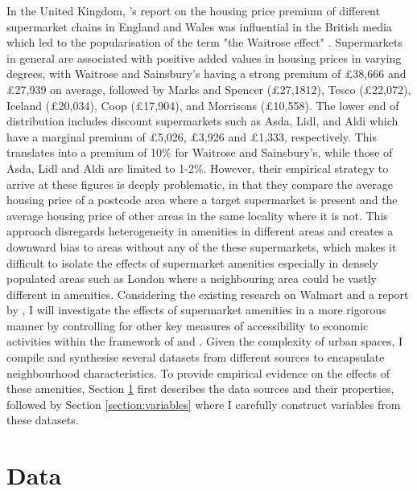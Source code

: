 \documentclass{article}
\begin{document}
In the United Kingdom, \citet{LloydsBank2016LivingHome}'s report on the housing price premium of different supermarket chains in England and Wales was influential in the British media which led to the popularisation of the term "the Waitrose effect" \citep{TheIndependent2017WaitrosePounds}. Supermarkets in general are associated with positive added values in housing prices in varying degrees, with Waitrose and Sainsbury's having a strong premium of £38,666 and £27,939 on average, followed by Marks and Spencer (£27,1812), Tesco (£22,072), Iceland (£20,034), Coop (£17,904), and Morrisons (£10,558). The lower end of distribution includes discount supermarkets such as Asda, Lidl, and Aldi which have a marginal premium of £5,026, £3,926 and £1,333, respectively. This translates into a premium of 10\% for Waitrose and Sainsbury's, while those of Asda, Lidl and Aldi are limited to 1-2\%. However, their empirical strategy to arrive at these figures is deeply problematic, in that they compare the average housing price of a postcode area where a target supermarket is present and the average housing price of other areas in the same locality where it is not. This approach disregards heterogeneity in amenities in different areas and creates a downward bias to areas without any of the these supermarkets, which makes it difficult to isolate the effects of supermarket amenities especially in densely populated areas such as London where a neighbouring area could be vastly different in amenities. Considering the existing research on Walmart and a report by \citet{LloydsBank2016LivingHome}, I will investigate the effects of supermarket amenities in a more rigorous manner by controlling for other key measures of accessibility to economic activities within the framework of \citet{AlonsoWilliam1964Lalu} and \citet{Rosen1984}. Given the complexity of urban spaces, I compile and synthesise several datasets from different sources to encapsulate neighbourhood characteristics. To provide empirical evidence on the effects of these amenities, Section \ref{section:data} first describes the data sources and their properties, followed by Section \ref{section:variables} where I carefully construct variables from these datasets.


\section{Data} \label{section:data}
\end{document}
